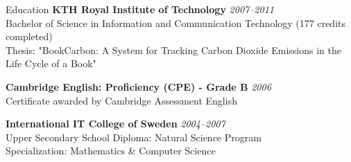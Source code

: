 \documentclass{resume}
\begin{document}
  \begin{rSection}{Education}
    {\bf KTH Royal Institute of Technology}
    \hfill {\em 2007--2011 } \\
    { Bachelor of Science in Information and Communication Technology (177 credits completed) } \\
    { Thesis: "BookCarbon: A System for Tracking Carbon Dioxide Emissions in the Life Cycle of a Book" }

    {\bf Cambridge English: Proficiency (CPE) - Grade B}
    \hfill {\em 2006 } \\
    { Certificate awarded by Cambridge Assessment English }

    {\bf International IT College of Sweden}
    \hfill {\em 2004--2007 } \\
    { Upper Secondary School Diploma: Natural Science Program } \\
    { Specialization: Mathematics \& Computer Science }
  \end{rSection}
\end{document}
